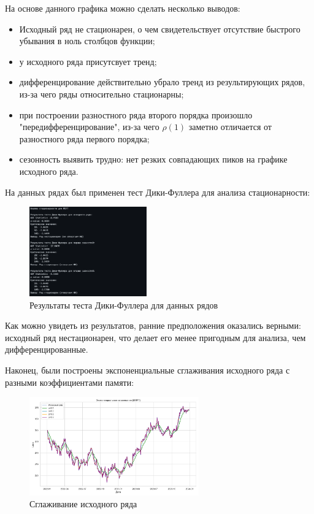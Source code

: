 \documentclass[a4paper, 12pt]{report}
\begin{document}
На основе данного графика можно сделать несколько выводов:
\begin{itemize}
    \setlength{\itemsep}{0pt}
    \item Исходный ряд не стационарен, о чем свидетельствует отсутствие быстрого убывания в ноль столбцов функции;
    \item у исходного ряда присутсвует тренд;
    \item дифференцирование действительно убрало тренд из результирующих рядов, из-за чего ряды относительно стационарны;
    \item при построении разностного ряда второго порядка произошло "передифференцирование", из-за чего $\rho (1)$ 
    заметно отличается от разностного ряда первого порядка;
    \item сезонность выявить трудно: нет резких совпадающих пиков на графике исходного ряда.
\end{itemize}

На данных рядах был применен тест Дики-Фуллера для анализа стационарности:

\begin{figure}[h]
    \centering
    \includegraphics[width=0.45\textwidth]{MSFT_stationary_analysis_res.png}
    \caption{Результаты теста Дики-Фуллера для данных рядов}
\end{figure} \par

Как можно увидеть из результатов, ранние предположения оказались верными: исходный ряд нестационарен, 
что делает его менее пригодным для анализа, чем дифференцированные.\par
Наконец, были построены экспоненциальные сглаживания исходного ряда с разными коэффициентами памяти:

\begin{figure}[h]
    \centering
    \includegraphics[width=0.65\textwidth]{MSFT_smoothing.png}
    \caption{Сглаживание исходного ряда}
\end{figure} \par
\end{document}
